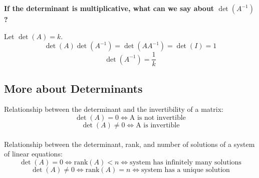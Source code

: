 \documentclass[oneside]{book}
\begin{document}
\textbf{If the determinant is multiplicative, what can we say about $\det(A^{-1})$?
}

Let $\det(A) = k$. 
\[
    \det(A) \det(A^{-1}) = \det(AA^{-1}) = \det(I) = 1
\]
\[
    \det(A^{-1}) = \frac{1}{k}
\]




\subsection{More about Determinants}


Relationship between the determinant and the invertibility of a matrix:
\[
    \det(A) = 0 \iff \text{A is not invertible}
\]
\[
    \det(A) \neq 0 \iff \text{A is invertible}
\]
\\
Relationship between the determinant, rank, and number of solutions of a system of linear equations:
\[
    \det(A) = 0 \iff \text{rank}(A) < n \iff \text{system has infinitely many solutions}
\]
\[
    \det(A) \neq 0 \iff \text{rank}(A) = n \iff \text{system has a unique solution}
\]
\end{document}
